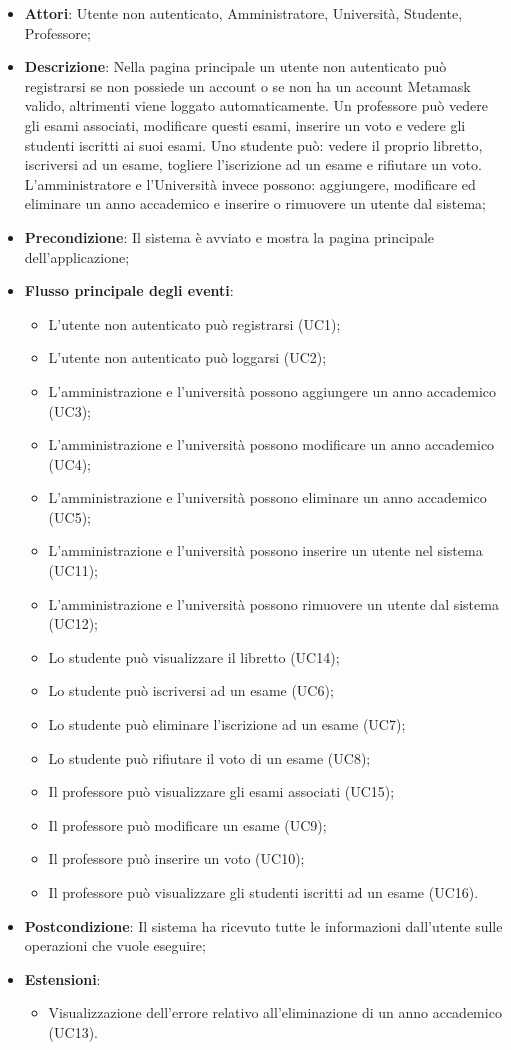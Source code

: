 \begin{itemize}
	\item \textbf{Attori}: Utente non autenticato, Amministratore, Università, Studente, Professore;
	\item \textbf{Descrizione}: Nella pagina principale un utente non autenticato può registrarsi se non possiede un account o se non ha un account Metamask valido, altrimenti viene loggato automaticamente.
	Un professore può vedere gli esami associati, modificare questi esami, inserire un voto e vedere gli studenti iscritti ai suoi esami.
	Uno studente può: vedere il proprio libretto, iscriversi ad un esame, togliere l'iscrizione ad un esame e rifiutare un voto.
	L'amministratore e l'Università invece possono: aggiungere, modificare ed eliminare un anno accademico e inserire o rimuovere un utente dal sistema;
	\item \textbf{Precondizione}: Il sistema è avviato e mostra la pagina principale dell'applicazione;
	\item \textbf{Flusso principale degli eventi}: 
	\begin{itemize}
		\item L'utente non autenticato può registrarsi (UC1);
		\item L'utente non autenticato può loggarsi (UC2);
		\item L'amministrazione e l'università possono aggiungere un anno accademico (UC3);
		\item L'amministrazione e l'università possono modificare un anno accademico (UC4);
		\item L'amministrazione e l'università possono eliminare un anno accademico (UC5);
		\item L'amministrazione e l'università possono inserire un utente nel sistema (UC11);
		\item L'amministrazione e l'università possono rimuovere un utente dal sistema (UC12);
		\item Lo studente può visualizzare il libretto (UC14);
		\item Lo studente può iscriversi ad un esame (UC6);
		\item Lo studente può eliminare l'iscrizione ad un esame (UC7);
		\item Lo studente può rifiutare il voto di un esame (UC8);
		\item Il professore può visualizzare gli esami associati (UC15);
		\item Il professore può modificare un esame (UC9);
		\item Il professore può inserire un voto (UC10);
		\item Il professore può visualizzare gli studenti iscritti ad un esame (UC16).
	\end{itemize}
	\item \textbf{Postcondizione}: Il sistema ha ricevuto tutte le informazioni dall’utente sulle operazioni che vuole eseguire;
	\item \textbf{Estensioni}:
	\begin{itemize}
		\item Visualizzazione dell'errore relativo all'eliminazione di un anno accademico (UC13).
	\end{itemize}
\end{itemize}
